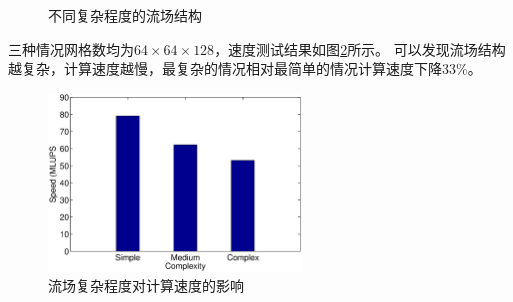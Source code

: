 \begin{figure}[htpb]
{\begin{minipage}[b]{0.3\textwidth}
      \label{fig:chp6_B}
    \end{minipage}
  }
  \caption{不同复杂程度的流场结构}
\end{figure}

三种情况网格数均为$64\times 64 \times 128$，速度测试结果如图\ref{fig:chp6_speed_ABC}所示。
可以发现流场结构越复杂，计算速度越慢，最复杂的情况相对最简单的情况计算速度下降33\%。
\begin{figure}[htb]
  \centering
  \includegraphics[width=0.6\textwidth]{img/chp6_speed_ABC}
  \caption{流场复杂程度对计算速度的影响}
  \label{fig:chp6_speed_ABC}
\end{figure}


